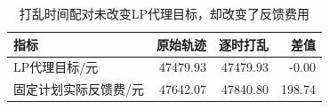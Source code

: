 \begin{table}[H]
\centering\small
\caption{打乱时间配对未改变LP代理目标，却改变了反馈费用}
\label{tab:scenario_diagnostic}
\begin{tabular}{lrrr}\toprule
指标 & 原始轨迹 & 逐时打乱 & 差值 \\\midrule
LP代理目标/元 & 47479.93 & 47479.93 & -0.00 \\
固定计划实际反馈费/元 & 47642.07 & 47840.80 & 198.74 \\
\bottomrule\end{tabular}
\end{table}
